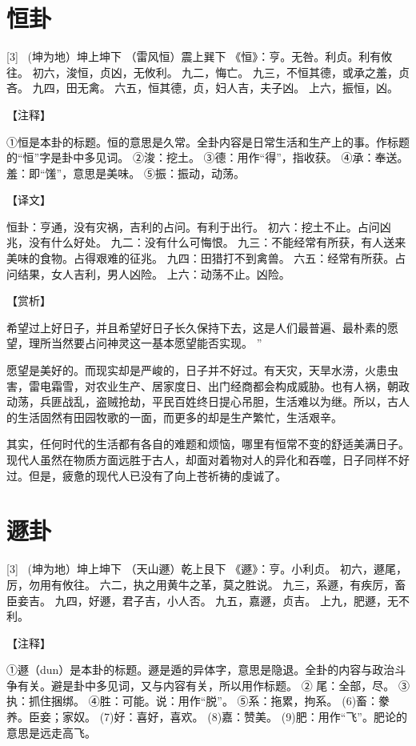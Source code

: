 \documentclass[12pt,UTF8]{ctexbook}
\begin{document}
\chapter{恒卦}
[3] \ (坤为地）坤上坤下
（雷风恒）震上巽下
《恒》：亨。无咎。利贞。利有攸往。
初六，浚恒，贞凶，无攸利。
九二，悔亡。
九三，不恒其德，或承之羞，贞吝。
九四，田无禽。
六五，恒其德，贞，妇人吉，夫子凶。
上六，振恒，凶。

【注释】

①恒是本卦的标题。恒的意思是久常。全卦内容是日常生活和生产上的事。作标题的“恒”字是卦中多见词。
②浚：挖土。
③德：用作“得”，指收获。
④承：奉送。羞：即“馐”，意思是美味。
⑤振：振动，动荡。

【译文】

恒卦：亨通，没有灾祸，吉利的占问。有利于出行。
初六：挖土不止。占问凶兆，没有什么好处。
九二：没有什么可悔恨。
九三：不能经常有所获，有人送来美味的食物。占得艰难的征兆。
九四：田猎打不到禽兽。
六五：经常有所获。占问结果，女人吉利，男人凶险。
上六：动荡不止。凶险。

【赏析】

希望过上好日子，并且希望好日子长久保持下去，这是人们最普遍、最朴素的愿望，理所当然要占问神灵这一基本愿望能否实现。 ”

愿望是美好的。而现实却是严峻的，日子并不好过。有天灾，天旱水涝，火患虫害，雷电霜雪，对农业生产、居家度日、出门经商都会构成威胁。也有人祸，朝政动荡，兵匪战乱，盗贼抢劫，平民百姓终日提心吊胆，生活难以为继。所以，古人的生活固然有田园牧歌的一面，而更多的却是生产繁忙，生活艰辛。

其实，任何时代的生活都有各自的难题和烦恼，哪里有恒常不变的舒适美满日子。现代人虽然在物质方面远胜于古人，却面对着物对人的异化和吞噬，日子同样不好过。但是，疲惫的现代人已没有了向上苍祈祷的虔诚了。

\chapter{遯卦}
[3] \ (坤为地）坤上坤下
（天山遯）乾上艮下
《遯》：亨。小利贞。
初六，遯尾，厉，勿用有攸往。
六二，执之用黄牛之革，莫之胜说。
九三，系遯，有疾厉，畜臣妾吉。
九四，好遯，君子吉，小人否。
九五，嘉遯，贞吉。
上九，肥遯，无不利。

【注释】

①遯（dun）是本卦的标题。遯是遁的异体字，意思是隐退。全卦的内容与政治斗争有关。避是卦中多见词，又与内容有关，所以用作标题。
② 尾：全部，尽。
③执：抓住捆绑。
④胜：可能。说：用作“脱”。
⑤系：拖累，拘系。
(6)畜：豢养。臣妾；家奴。
(7)好：喜好，喜欢。
(8)嘉：赞美。
(9)肥：用作“飞”。肥论的意思是远走高飞。
\end{document}
